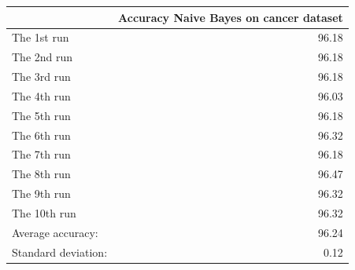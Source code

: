 \begin{tabular}{lr}
\toprule
{} &  Accuracy Naive Bayes on cancer dataset \\
\midrule
The 1st run         &                                   96.18 \\
The 2nd run         &                                   96.18 \\
The 3rd run         &                                   96.18 \\
The 4th run         &                                   96.03 \\
The 5th run         &                                   96.18 \\
The 6th run         &                                   96.32 \\
The 7th run         &                                   96.18 \\
The 8th run         &                                   96.47 \\
The 9th run         &                                   96.32 \\
The 10th run        &                                   96.32 \\
Average accuracy:   &                                   96.24 \\
Standard deviation: &                                    0.12 \\
\bottomrule
\end{tabular}
